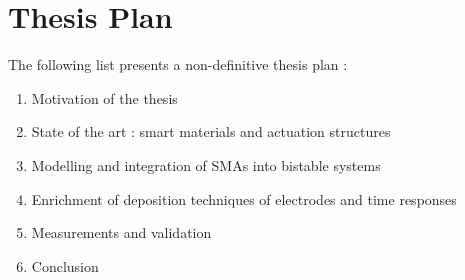 \section{Thesis Plan}
The following list presents a non-definitive thesis plan :
\begin{enumerate}
  \item Motivation of the thesis
  \item State of the art : smart materials and actuation structures
  \item Modelling and integration of SMAs into bistable systems
  \item Enrichment of deposition techniques of electrodes and time responses
  \item Measurements and validation
  \item Conclusion
\end{enumerate}
